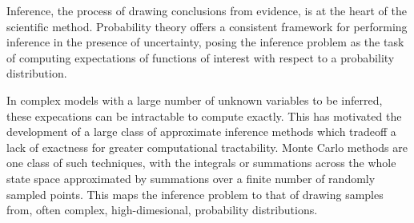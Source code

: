 
Inference, the process of drawing conclusions from evidence, is at the heart of the scientific method. Probability theory offers a consistent framework for performing inference in the presence of uncertainty, posing the inference problem as the task of computing expectations of functions of interest with respect to a probability distribution.


In complex models with a large number of unknown variables to be inferred, these expecations can be intractable to compute exactly. This has motivated the development of a large class of approximate inference methods which tradeoff a lack of exactness for greater computational tractability. Monte Carlo methods are one class of such techniques, with the integrals or summations across the whole state space approximated by summations over a finite number of randomly sampled points. This maps the inference problem to that of drawing samples from, often complex, high-dimesional, probability distributions.



